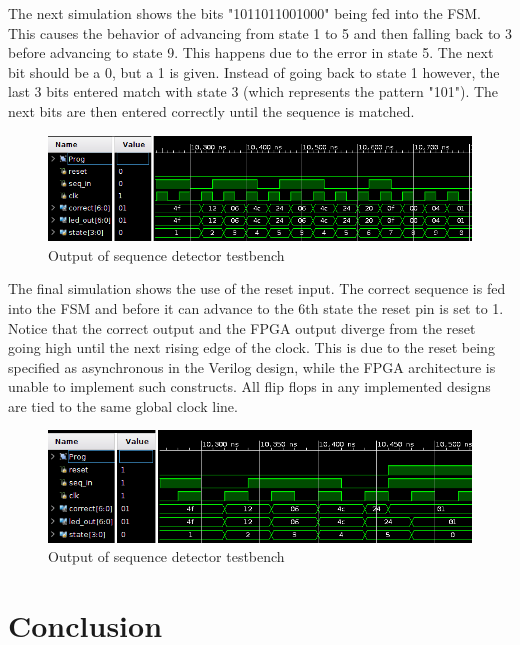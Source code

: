 \documentclass[12pt]{article}
\begin{document}
The next simulation shows 
the bits "1011011001000" being fed into the FSM. This causes the behavior of advancing
from state 1 to 5 and then falling back to 3 before advancing to state 9. This happens
due to the error in state 5. The next bit should be a 0, but a 1 is given. Instead of
going back to state 1 however, the last 3 bits entered match with state 3 (which represents
the pattern "101"). The next bits are then entered correctly until the sequence is matched.

\begin{figure}[H]
    \centering
    \includegraphics[width=1\textwidth]{break_and_continue}
    \caption{Output of sequence detector testbench}
    \label{fig:break_and_continue}
\end{figure}

The final simulation shows the use of the reset input. The correct sequence is fed into
the FSM and before it can advance to the 6th state the reset pin is set to 1. Notice that
the correct output and the FPGA output diverge from the reset going high until the next
rising edge of the clock. This is due to the reset being specified as asynchronous in the
Verilog design, while the FPGA architecture is unable to implement such constructs. All
flip flops in any implemented designs are tied to the same global clock line.

\begin{figure}[H]
    \centering
    \includegraphics[width=1\textwidth]{reset}
    \caption{Output of sequence detector testbench}
    \label{fig:reset}
\end{figure}

\newpage
\section{Conclusion} \label{sec:conclusion}
\end{document}
